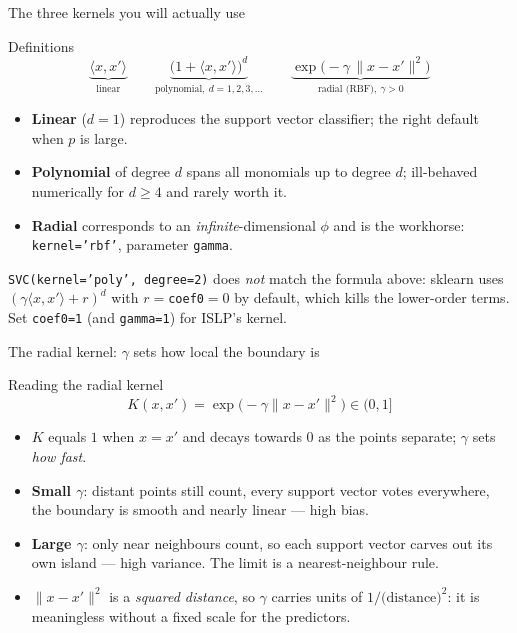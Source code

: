 \documentclass[aspectratio=169,11pt]{beamer}
\begin{document}
\begin{frame}{The three kernels you will actually use}
  \footnotesize
  \begin{block}{Definitions}
    \[
      \underbrace{\langle x, x'\rangle}_{\text{linear}}
      \qquad
      \underbrace{\big(1+\langle x, x'\rangle\big)^{d}}_{\text{polynomial},\ d=1,2,3,\dots}
      \qquad
      \underbrace{\exp\!\big(-\gamma\,\|x-x'\|^2\big)}_{\text{radial (RBF)},\ \gamma>0}
    \]
  \end{block}
  \begin{readme}
    \begin{itemize}
      \item \textbf{Linear} ($d=1$) reproduces the support vector classifier;
            the right default when $p$ is large.
      \item \textbf{Polynomial} of degree $d$ spans all monomials up to degree
            $d$; ill-behaved numerically for $d\ge4$ and rarely worth it.
      \item \textbf{Radial} corresponds to an \emph{infinite}-dimensional
            $\phi$ and is the workhorse: \texttt{kernel='rbf'}, parameter
            \texttt{gamma}.
    \end{itemize}
  \end{readme}
  \begin{mistake}
    \texttt{SVC(kernel='poly', degree=2)} does \emph{not} match the formula
    above: sklearn uses $(\gamma\langle x,x'\rangle + r)^d$ with
    $r=$\texttt{coef0}$=0$ by default, which kills the lower-order terms. Set
    \texttt{coef0=1} (and \texttt{gamma=1}) for ISLP's kernel.
  \end{mistake}
\end{frame}

\begin{frame}{The radial kernel: $\gamma$ sets how local the boundary is}
  \footnotesize
  \begin{block}{Reading the radial kernel}
    \[
      \boxed{\;K(x,x') = \exp\!\big(-\gamma\|x-x'\|^2\big) \in (0,1] \;}
    \]
  \end{block}
  \begin{readme}
    \begin{itemize}
      \item $K$ equals $1$ when $x=x'$ and decays towards $0$ as the points
            separate; $\gamma$ sets \emph{how fast}.
      \item \textbf{Small $\gamma$}: distant points still count, every support
            vector votes everywhere, the boundary is smooth and nearly linear
            --- high bias.
      \item \textbf{Large $\gamma$}: only near neighbours count, so each
            support vector carves out its own island --- high variance. The
            limit is a nearest-neighbour rule.
      \item $\|x-x'\|^2$ is a \emph{squared distance}, so $\gamma$ carries
            units of $1/\text{(distance)}^2$: it is meaningless without a fixed
            scale for the predictors.
    \end{itemize}
  \end{readme}
\end{frame}
\end{document}
